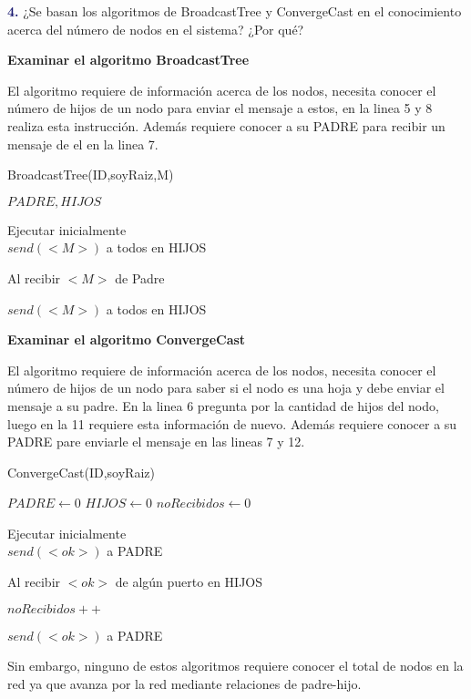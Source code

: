 \newpage
\textbf{\textcolor{MidnightBlue}{4.}}
¿Se basan los algoritmos de BroadcastTree
y ConvergeCast en el conocimiento acerca
del número de nodos en el sistema? ¿Por qué?

\textbf{Examinar el algoritmo BroadcastTree}

El algoritmo requiere de  información acerca de los nodos, necesita conocer el número de hijos de un nodo para enviar el mensaje a estos, en la linea 5 y 8 realiza esta instrucción. Además requiere conocer a su PADRE para recibir un mensaje de el en la linea 7.

\begin{algorithm}
\caption{BroadcastTree(ID,soyRaiz,M)}\label{alg:cap}
\begin{algorithmic}[1]
\State $PADRE, HIJOS$

\State Ejecutar inicialmente\\

    \State $send(<M>)$ a todos en HIJOS
\EndIf

\State Al recibir $<M>$ de Padre

\State $send(<M>)$ a todos en HIJOS

\end{algorithmic}
\end{algorithm}



\textbf{Examinar el algoritmo ConvergeCast}

El algoritmo requiere de  información acerca de los nodos, necesita conocer el número de hijos de un nodo para saber si el nodo es una hoja y debe enviar el mensaje a su padre. En la linea 6 pregunta por la cantidad de hijos del nodo, luego en la 11 requiere esta información de nuevo.  Además requiere conocer a su PADRE pare enviarle el mensaje en las lineas 7 y 12.

\begin{algorithm}
\caption{ConvergeCast(ID,soyRaiz)}\label{alg:cap}
\begin{algorithmic}[1]
\State $PADRE \gets 0$
\State $HIJOS \gets 0$
\State $noRecibidos \gets 0$

\State Ejecutar inicialmente\\

    \State $send(<ok>)$ a PADRE
\EndIf

\State Al recibir $<ok>$ de algún puerto en HIJOS

\State $noRecibidos++$

    \State $send(<ok>)$ a PADRE
\EndIf

\end{algorithmic}
\end{algorithm}

Sin embargo, ninguno de estos algoritmos requiere conocer el total de nodos en la red ya que avanza por la red mediante relaciones de padre-hijo.